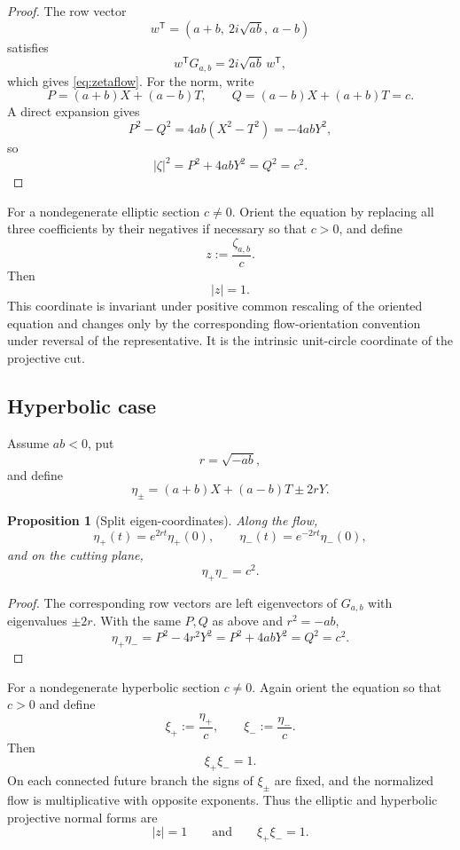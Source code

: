 \documentclass[11pt]{amsart}
\newtheorem{proposition}[theorem]{Proposition}
\theoremstyle{remark}
\begin{document}
\begin{proof}
The row vector
\[
w^{\mathsf T}=(a+b,\ 2i\sqrt{ab},\ a-b)
\]
satisfies
\[
w^{\mathsf T}G_{a,b}=2i\sqrt{ab}\,w^{\mathsf T},
\]
which gives \eqref{eq:zetaflow}.  For the norm, write
\[
P=(a+b)X+(a-b)T,
\qquad
Q=(a-b)X+(a+b)T=c.
\]
A direct expansion gives
\[
P^2-Q^2
=4ab(X^2-T^2)
=-4abY^2,
\]
so
\[
|\zeta|^2=P^2+4abY^2=Q^2=c^2.
\]
\end{proof}

For a nondegenerate elliptic section $c\ne0$.  Orient the equation by replacing all three coefficients by their negatives if necessary so that $c>0$, and define
\begin{equation}\label{eq:zprojective}
\boxed{z:=\frac{\zeta_{a,b}}{c}.}
\end{equation}
Then
\[
|z|=1.
\]
This coordinate is invariant under positive common rescaling of the oriented equation and changes only by the corresponding flow-orientation convention under reversal of the representative.  It is the intrinsic unit-circle coordinate of the projective cut.

\subsection{Hyperbolic case}
Assume $ab<0$, put
\[
r=\sqrt{-ab},
\]
and define
\begin{equation}\label{eq:etas}
\eta_\pm=(a+b)X+(a-b)T\pm2rY.
\end{equation}

\begin{proposition}[Split eigen-coordinates]\label{prop:eta}
Along the flow,
\[
\eta_+(t)=e^{2rt}\eta_+(0),
\qquad
\eta_-(t)=e^{-2rt}\eta_-(0),
\]
and on the cutting plane,
\begin{equation}\label{eq:etaproduct}
\boxed{\eta_+\eta_-=c^2.}
\end{equation}
\end{proposition}

\begin{proof}
The corresponding row vectors are left eigenvectors of $G_{a,b}$ with eigenvalues $\pm2r$.  With the same $P,Q$ as above and $r^2=-ab$,
\[
\eta_+\eta_-=P^2-4r^2Y^2
=P^2+4abY^2
=Q^2=c^2.
\]
\end{proof}

For a nondegenerate hyperbolic section $c\ne0$.  Again orient the equation so that $c>0$ and define
\begin{equation}\label{eq:xiprojective}
\boxed{
\xi_+:=\frac{\eta_+}{c},
\qquad
\xi_-:=\frac{\eta_-}{c}.
}
\end{equation}
Then
\begin{equation}\label{eq:xiproduct}
\boxed{\xi_+\xi_-=1.}
\end{equation}
On each connected future branch the signs of $\xi_\pm$ are fixed, and the normalized flow is multiplicative with opposite exponents.  Thus the elliptic and hyperbolic projective normal forms are
\[
|z|=1
\qquad\text{and}\qquad
\xi_+\xi_-=1.
\]
\end{document}
